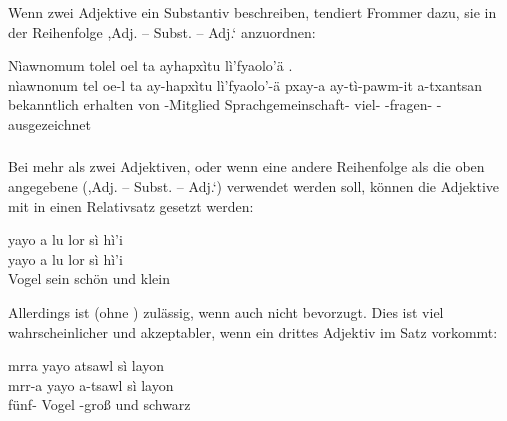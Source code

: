 \subsubsection{} Wenn zwei Adjektive ein Substantiv beschreiben, tendiert Frommer dazu, sie in der Reihenfolge ,Adj. -- Subst. -- Adj.‘ anzuordnen:

\begin{interlin}
	\glll \Npawl{}Nìawnomum tolel oel ta ayhapxìtu lì'fyaolo'ä   . \\
	nìawnonum tel oe-l ta ay-hapxìtu lì'fyaolo'-ä pxay-a ay-tì-pawm-it a-txantsan \\
	bekanntlich erhalten  von -Mitglied Sprachgemeinschaft- viel- -fragen- -ausgezeichnet \\
\end{interlin}

\subsubsection{} Bei mehr als zwei Adjektiven, oder wenn eine andere Reihenfolge als die oben angegebene (,Adj. -- Subst. -- Adj.‘) verwendet werden soll, können die Adjektive mit  in einen Relativsatz gesetzt werden:

\begin{interlin}
	\glll \Npawl{}yayo a lu lor sì hì'i \\
	yayo a lu lor sì hì'i \\
	Vogel  sein schön und klein \\
\end{interlin}

\noindent Allerdings ist  (ohne ) zulässig, wenn auch nicht bevorzugt. Dies ist viel wahrscheinlicher und akzeptabler, wenn ein drittes Adjektiv im Satz vorkommt:

\begin{interlin}
	\glll \Npawl{}mrra yayo atsawl sì layon \\
	mrr-a yayo a-tsawl sì layon \\
	fünf- Vogel -groß und schwarz \\
\end{interlin}

